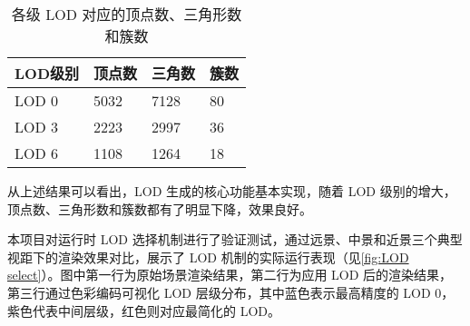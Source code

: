 \begin{table}[H]
    \caption{\label{tab:LOD}各级 LOD 对应的顶点数、三角形数和簇数}
    \begin{tabularx}{\linewidth}{|X<{\centering}|X<{\centering}|X<{\centering}|X<{\centering}|}
        \hline
        LOD级别 & 顶点数 & 三角数 & 簇数 \\ \hline
        LOD 0 & 5032 & 7128 & 80 \\ \hline
        LOD 3 & 2223 & 2997 & 36 \\ \hline
        LOD 6 & 1108 & 1264 & 18 \\ \hline
    \end{tabularx}
\end{table}

从上述结果可以看出，LOD 生成的核心功能基本实现，随着 LOD 级别的增大，顶点数、三角形数和簇数都有了明显下降，效果良好。

本项目对运行时 LOD 选择机制进行了验证测试，通过远景、中景和近景三个典型视距下的渲染效果对比，展示了 LOD 机制的实际运行表现（见\autoref{fig:LOD select}）。图中第一行为原始场景渲染结果，第二行为应用 LOD 后的渲染结果，第三行通过色彩编码可视化 LOD 层级分布，其中蓝色表示最高精度的 LOD 0，紫色代表中间层级，红色则对应最简化的 LOD。

